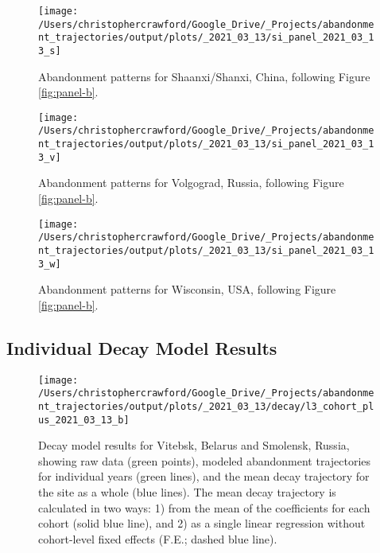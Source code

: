\documentclass[9pt,twoside,lineno]{pnas-new}
\begin{document}
\begin{figure}
\texttt{[image: /Users/christophercrawford/Google\_Drive/\_Projects/abandonment\_trajectories/output/plots/\_2021\_03\_13/si\_panel\_2021\_03\_13\_s]} \caption{Abandonment patterns for Shaanxi/Shanxi, China, following Figure \ref{fig:panel-b}.}\label{fig:panel-s}
\end{figure}

\begin{figure}
\texttt{[image: /Users/christophercrawford/Google\_Drive/\_Projects/abandonment\_trajectories/output/plots/\_2021\_03\_13/si\_panel\_2021\_03\_13\_v]} \caption{Abandonment patterns for Volgograd, Russia, following Figure \ref{fig:panel-b}.}\label{fig:panel-v}
\end{figure}

\begin{figure}
\texttt{[image: /Users/christophercrawford/Google\_Drive/\_Projects/abandonment\_trajectories/output/plots/\_2021\_03\_13/si\_panel\_2021\_03\_13\_w]} \caption{Abandonment patterns for Wisconsin, USA, following Figure \ref{fig:panel-b}.}\label{fig:panel-w}
\end{figure}

\newpage

\hypertarget{individual-decay-model-results}{%
\subsection{Individual Decay Model Results}\label{individual-decay-model-results}}























\begin{figure}
\texttt{[image: /Users/christophercrawford/Google\_Drive/\_Projects/abandonment\_trajectories/output/plots/\_2021\_03\_13/decay/l3\_cohort\_plus\_2021\_03\_13\_b]} \caption{Decay model results for Vitebsk, Belarus and Smolensk, Russia, showing raw data (green points), modeled abandonment trajectories for individual years (green lines), and the mean decay trajectory for the site as a whole (blue lines). The mean decay trajectory is calculated in two ways: 1) from the mean of the coefficients for each cohort (solid blue line), and 2) as a single linear regression without cohort-level fixed effects (F.E.; dashed blue line).}\label{fig:decay-model-indiv-site-b}
\end{figure}
\end{document}
